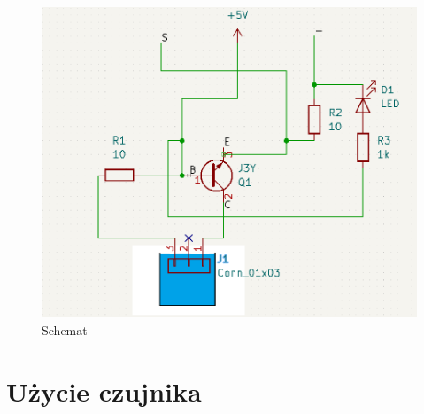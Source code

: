 \documentclass[11pt, a4paper]{article}
\begin{document}
\vspace{0.5cm}
\begin{figure}[h]
  \centering
  \includegraphics[width=.55\linewidth]{fig/obrazki/zasada_dzialania/KICAD.png}  
  \caption{Schemat}
  \label{fig:sub1}
\end{figure}





\newpage






\newpage

\section{Użycie czujnika}

\end{document}
